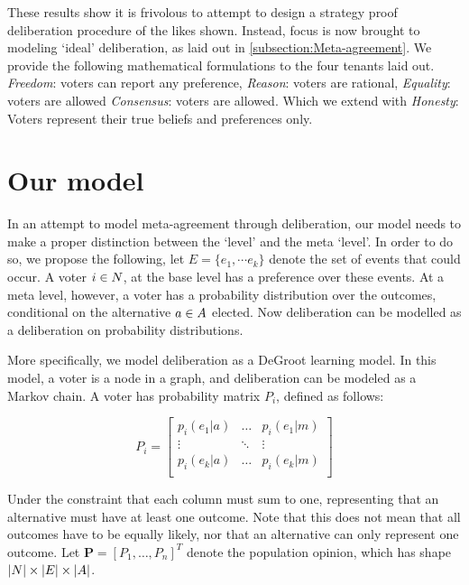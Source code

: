 These results show it is frivolous to attempt to design a strategy proof deliberation procedure of the likes shown. Instead, focus is now brought to modeling `ideal' deliberation, as laid out in \cref{subsection:Meta-agreement}. We provide the following mathematical formulations to the four tenants laid out. \textit{Freedom}: voters can report any preference, \textit{Reason}: voters are rational, \textit{Equality}: voters are allowed \textit{Consensus}:  voters are allowed. Which we extend with \textit{Honesty}: Voters represent their true beliefs and preferences only.


\section{Our model}
\label{sec: main model}


In an attempt to model meta-agreement through deliberation, our model needs to make a proper distinction between the `level' and the meta `level'. In order to do so, we propose the following, let \(E = \{e_{1}, \cdots e_{k}\}\) denote the set of events that could occur. A voter $i \in N$, at the base level has a preference over these events. At a meta level, however, a voter has a probability distribution over the outcomes, conditional on the alternative \(a \in A\) elected. Now deliberation can be modelled as a deliberation on probability distributions.

More specifically, we model deliberation as a DeGroot learning model. In this model, a voter is a node in a graph, and deliberation can be modeled as a Markov chain. A voter has probability matrix $P_i$, defined as follows:

\[
	P_i =\begin{bmatrix}
		p_i(e_1 | a) & \dots  & p_i(e_1 | m) \\
		\vdots       & \ddots & \vdots       \\
		p_i(e_k | a) & \dots  & p_i(e_k | m) \\
	\end{bmatrix}
\]

Under the constraint that each column must sum to one, representing that an alternative must have at least one outcome. Note that this does not mean that all outcomes have to be equally likely, nor that an alternative can only represent one outcome.  Let $\boldsymbol{P}= [P_1, \dots, P_{n}]^{T}$ denote the population opinion, which has shape \(|N| \times |E| \times |A|\).

